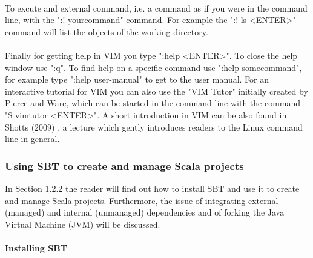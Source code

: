 \documentclass {article}
\begin{document}
\\
To excute and external command, i.e. a command as if you were in the command line, with the ":! your\underline{\space}command" command.
 For example the ":! ls <ENTER>" command will list the objects of the working directory. 
\\
\\
Finally for getting help in VIM you type ":help <ENTER>".
 To close the help window use ":q". 
To find help on a specific command use ":help some\underline{\space}command", for example type ":help user-manual" to get to the user manual.
 For an interactive tutorial for VIM you can also use the "VIM Tutor" initially created by Pierce and Ware, which can be started in the command line with the command "\$ vimtutor <ENTER>". 
A short introduction in VIM can be also found in Shotts (2009) \cite{shotts_linux_2009}, a lecture which gently introduces readers to the Linux command line in general. 

\subsubsection {Using SBT to create and manage Scala projects}

In Section 1.2.2 the reader will find out how to install SBT and use it to create and manage Scala projects. 
Furthermore, the issue of integrating external (managed) and internal (unmanaged) dependencies and of forking the Java Virtual Machine (JVM) will be discussed.

\paragraph {Installing SBT}
\end{document}

